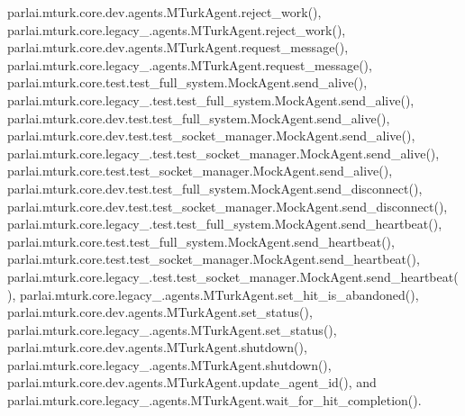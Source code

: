 parlai.\+mturk.\+core.\+dev.\+agents.\+M\+Turk\+Agent.\+reject\+\_\+work(), parlai.\+mturk.\+core.\+legacy\+\_.\+agents.\+M\+Turk\+Agent.\+reject\+\_\+work(), parlai.\+mturk.\+core.\+dev.\+agents.\+M\+Turk\+Agent.\+request\+\_\+message(), parlai.\+mturk.\+core.\+legacy\+\_.\+agents.\+M\+Turk\+Agent.\+request\+\_\+message(), parlai.\+mturk.\+core.\+test.\+test\+\_\+full\+\_\+system.\+Mock\+Agent.\+send\+\_\+alive(), parlai.\+mturk.\+core.\+legacy\+\_.\+test.\+test\+\_\+full\+\_\+system.\+Mock\+Agent.\+send\+\_\+alive(), parlai.\+mturk.\+core.\+dev.\+test.\+test\+\_\+full\+\_\+system.\+Mock\+Agent.\+send\+\_\+alive(), parlai.\+mturk.\+core.\+dev.\+test.\+test\+\_\+socket\+\_\+manager.\+Mock\+Agent.\+send\+\_\+alive(), parlai.\+mturk.\+core.\+legacy\+\_.\+test.\+test\+\_\+socket\+\_\+manager.\+Mock\+Agent.\+send\+\_\+alive(), parlai.\+mturk.\+core.\+test.\+test\+\_\+socket\+\_\+manager.\+Mock\+Agent.\+send\+\_\+alive(), parlai.\+mturk.\+core.\+dev.\+test.\+test\+\_\+full\+\_\+system.\+Mock\+Agent.\+send\+\_\+disconnect(), parlai.\+mturk.\+core.\+dev.\+test.\+test\+\_\+socket\+\_\+manager.\+Mock\+Agent.\+send\+\_\+disconnect(), parlai.\+mturk.\+core.\+legacy\+\_.\+test.\+test\+\_\+full\+\_\+system.\+Mock\+Agent.\+send\+\_\+heartbeat(), parlai.\+mturk.\+core.\+test.\+test\+\_\+full\+\_\+system.\+Mock\+Agent.\+send\+\_\+heartbeat(), parlai.\+mturk.\+core.\+test.\+test\+\_\+socket\+\_\+manager.\+Mock\+Agent.\+send\+\_\+heartbeat(), parlai.\+mturk.\+core.\+legacy\+\_.\+test.\+test\+\_\+socket\+\_\+manager.\+Mock\+Agent.\+send\+\_\+heartbeat(), parlai.\+mturk.\+core.\+legacy\+\_.\+agents.\+M\+Turk\+Agent.\+set\+\_\+hit\+\_\+is\+\_\+abandoned(), parlai.\+mturk.\+core.\+dev.\+agents.\+M\+Turk\+Agent.\+set\+\_\+status(), parlai.\+mturk.\+core.\+legacy\+\_.\+agents.\+M\+Turk\+Agent.\+set\+\_\+status(), parlai.\+mturk.\+core.\+dev.\+agents.\+M\+Turk\+Agent.\+shutdown(), parlai.\+mturk.\+core.\+legacy\+\_.\+agents.\+M\+Turk\+Agent.\+shutdown(), parlai.\+mturk.\+core.\+dev.\+agents.\+M\+Turk\+Agent.\+update\+\_\+agent\+\_\+id(), and parlai.\+mturk.\+core.\+legacy\+\_.\+agents.\+M\+Turk\+Agent.\+wait\+\_\+for\+\_\+hit\+\_\+completion().

\mbox{\label{classparlai_1_1mturk_1_1core_1_1dev_1_1agents_1_1MTurkAgent_a7ae94a33dcdde27b8eee312837072955}} 
